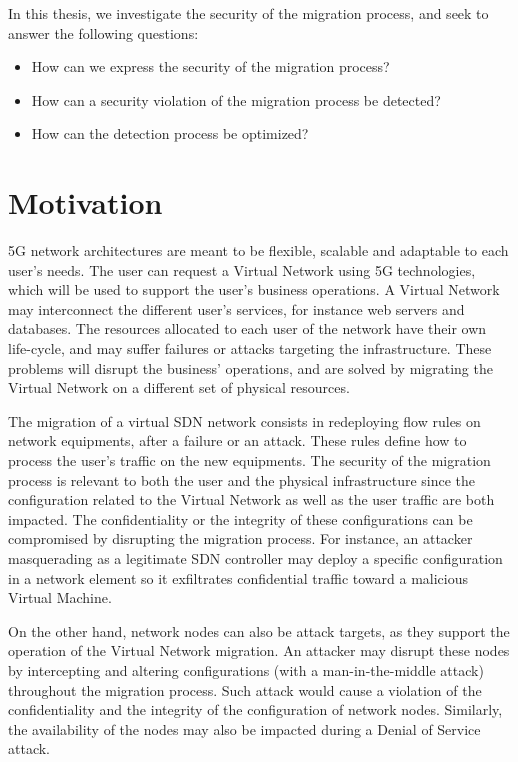 In this thesis, we investigate the security of the migration process, and seek to answer the following questions:

\begin{itemize}
    \item How can we express the security of the migration process?
    \item How can a security violation of the migration process be detected?
    \item How can the detection process be optimized?
\end{itemize}

\section{Motivation}
5G network architectures are meant to be flexible, scalable and adaptable to each user's needs.
The user can request a Virtual Network using 5G technologies, which will be used to support the user's business operations. A Virtual Network may interconnect the different user's services, for instance web servers and databases. 
The resources allocated to each user of the network have their own life-cycle, and may suffer failures or attacks targeting the infrastructure. These problems will disrupt the business' operations, and are solved by migrating the Virtual Network on a different set of physical resources.

The migration of a virtual SDN network consists in redeploying flow rules on network equipments, after a failure or an attack. These rules define how to process the user's traffic on the new equipments.
The security of the migration process is relevant to both the user and the physical infrastructure since the configuration related to the Virtual Network as well as the user traffic are both impacted. 
The confidentiality or the integrity of these configurations can be compromised by disrupting the migration process. For instance,  an attacker masquerading as a legitimate SDN controller may deploy a specific configuration in a network element so it exfiltrates confidential traffic toward a malicious Virtual Machine.

On the other hand, network nodes can also be attack targets, as they support the operation of the Virtual Network migration.
An attacker may disrupt these nodes by intercepting and altering configurations (\eg with a man-in-the-middle attack) throughout the migration process.
Such attack would cause a violation of the confidentiality and the integrity of the configuration of network nodes. Similarly, the availability of the nodes may also be impacted during a Denial of Service attack.

